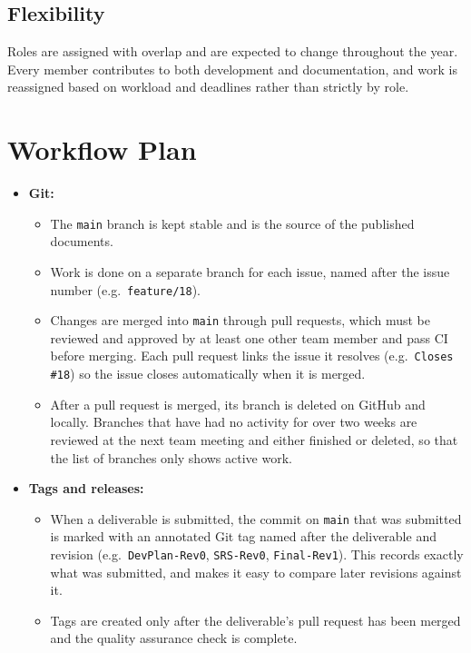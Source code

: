 \documentclass{article}
\begin{document}
\subsection{Flexibility}

Roles are assigned with overlap and are expected to change throughout the
year. Every member contributes to both development and documentation, and
work is reassigned based on workload and deadlines rather than strictly by
role.

\section{Workflow Plan}

\begin{itemize}
  \item \textbf{Git:}
  \begin{itemize}
    \item The \texttt{main} branch is kept stable and is the source of the
    published documents.
    \item Work is done on a separate branch for each issue, named after the
    issue number (e.g.\ \texttt{feature/18}).
    \item Changes are merged into \texttt{main} through pull requests, which
    must be reviewed and approved by at least one other team member and pass
    CI before merging. Each pull request links the issue it resolves (e.g.\
    \texttt{Closes \#18}) so the issue closes automatically when it is merged.
    \item After a pull request is merged, its branch is deleted on GitHub
    and locally. Branches that have had no activity for over two weeks are
    reviewed at the next team meeting and either finished or deleted, so that
    the list of branches only shows active work.
  \end{itemize}
  \item \textbf{Tags and releases:}
  \begin{itemize}
    \item When a deliverable is submitted, the commit on \texttt{main} that
    was submitted is marked with an annotated Git tag named after the
    deliverable and revision (e.g.\ \texttt{DevPlan-Rev0},
    \texttt{SRS-Rev0}, \texttt{Final-Rev1}). This records exactly what was
    submitted, and makes it easy to compare later revisions against it.
    \item Tags are created only after the deliverable's pull request has been
    merged and the quality assurance check is complete.

\end{itemize}
\end{itemize}
\end{document}
